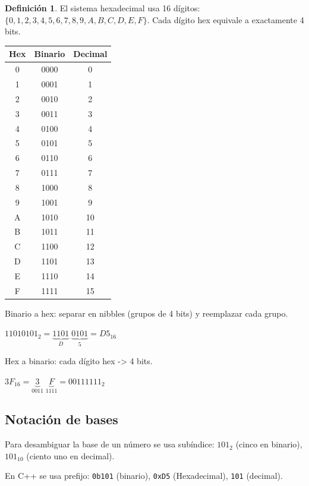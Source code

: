 \documentclass[10pt,a4paper]{article}
\theoremstyle{definition}
\newtheorem{definicion}{Definición}[section]
\begin{document}
\begin{definicion}
    El sistema hexadecimal usa 16 dígitos: $\{0,1,2,3,4,5,6,7,8,9,A,B,C,D,E,F\}$.
    Cada dígito hex equivale a exactamente 4 bits.
\end{definicion}

\begin{center}
    \begin{tabular}{c|c|c}
        \toprule
        Hex & Binario & Decimal \\
        \midrule
        0 & 0000 & 0 \\
        1 & 0001 & 1 \\
        2 & 0010 & 2 \\
        3 & 0011 & 3 \\
        4 & 0100 & 4 \\
        5 & 0101 & 5 \\
        6 & 0110 & 6 \\
        7 & 0111 & 7 \\
        8 & 1000 & 8 \\
        9 & 1001 & 9 \\
        A & 1010 & 10 \\
        B & 1011 & 11 \\
        C & 1100 & 12 \\
        D & 1101 & 13 \\
        E & 1110 & 14 \\
        F & 1111 & 15 \\
        \bottomrule
    \end{tabular}
\end{center}

Binario a hex: separar en nibbles (grupos de 4 bits)
y reemplazar cada grupo.

$11010101_{2} = \underbrace{1101}_{D}\;\underbrace{0101}_{5} = D5_{16}$

Hex a binario: cada dígito hex -> 4 bits.

$3F_{16} = \underbrace{3}_{0011}\;\underbrace{F}_{1111} = 00111111_{2}$

\subsection{Notación de bases}

Para desambiguar la base de un número se usa subíndice:
$101_2$ (cinco en binario), $101_{10}$ (ciento uno en decimal).

En C++ se usa prefijo: \texttt{0b101} (binario),
\texttt{0xD5} (Hexadecimal), \texttt{101} (decimal).
\end{document}
